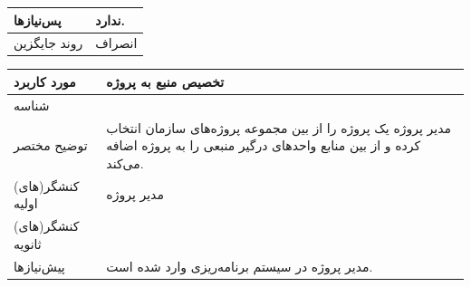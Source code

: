 \begin{table}[H]
\begin{tabular}{|p{3cm}|p{10cm}|}
		پس‌نیازها &
		ندارد. \\
		
		\hline
		
		روند جایگزین
		& انصراف \\
		\hline
		
	\end{tabular}
\end{table}





\begin{table}[H]
	\centering
	\begin{tabular}{|p{3cm}|p{10cm}|}
		\hline
		
		
		مورد کاربرد	& تخصیص منبع به پروژه  \\
		\hline
		
		شناسه & 
		\stepcounter{usecase_ID}
		
		\arabic{usecase_ID} \\
		
		\hline
		
		توضیح مختصر & مدیر پروژه یک پروژه را از بین مجموعه پروژه‌های سازمان انتخاب کرده و از بین منابع واحد‌های درگیر منبعی را به پروژه اضافه می‌کند. \\
		\hline
		
		کنشگر(های) اولیه & مدیر پروژه \\
		\hline
		
		کنشگر(های) ثانویه&  \\
		\hline
		
		پیش‌نیازها &
		مدیر پروژه در سیستم برنامه‌ریزی وارد شده است.\\
		\hline
		

\end{tabular}
\end{table}
